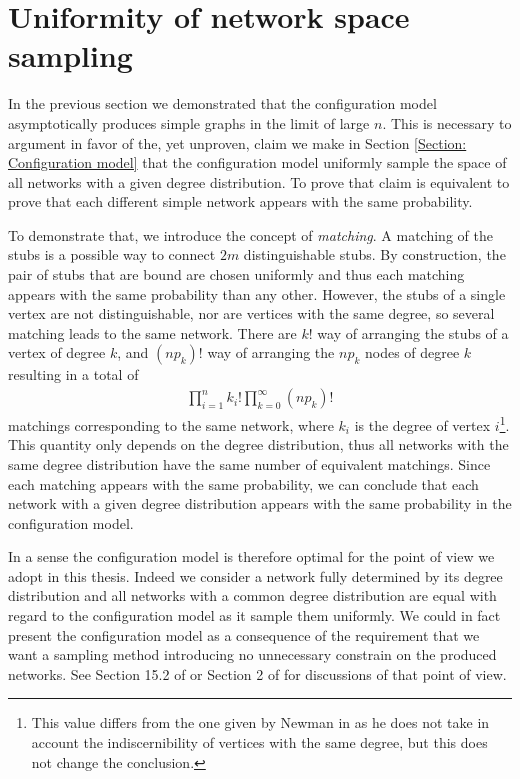 \documentclass[
11pt, %
american, %
singlespacing, %
final, %
nolistspacing, %
liststotoc, %
headsepline, %
]{MastersDoctoralThesis} %
\begin{document}
\section{Uniformity of network space sampling}

In the previous section we demonstrated that the configuration model asymptotically produces simple graphs in the limit of large $n$. This is necessary to argument in favor of the, yet unproven, claim we make in Section \ref{Section: Configuration model} that the configuration model uniformly sample the space of all networks with a given degree distribution. To prove that claim is equivalent to prove that each different simple network appears with the same probability.

To demonstrate that, we introduce the concept of \emph{matching}. A matching of the stubs is a possible way to connect $2 m$ distinguishable stubs. By construction, the pair of stubs that are bound are chosen uniformly and thus each matching appears with the same probability than any other. However, the stubs of a single vertex are not distinguishable, nor are vertices with the same degree, so several matching leads to the same network. There are $k!$ way of arranging the stubs of a vertex of degree $k$, and $(n p_k)!$ way of arranging the $n p_k$ nodes of degree $k$ resulting in a total of
\begin{align}
	\prod_{i = 1}^n k_i! \prod_{k = 0}^\infty (n p_k)!
\end{align}
matchings corresponding to the same network, where $k_i$ is the degree of vertex $i$\footnote{This value differs from the one given by Newman in \cite{newman2010networks} as he does not take in account the indiscernibility of vertices with the same degree, but this does not change the conclusion.}. This quantity only depends on the degree distribution, thus all networks with the same degree distribution have the same number of equivalent matchings. Since each matching appears with the same probability, we can conclude that each network with a given degree distribution appears with the same probability in the configuration model.

In a sense the configuration model is therefore optimal for the point of view we adopt in this thesis. Indeed we consider a network fully determined by its degree distribution and all networks with a common degree distribution are equal with regard to the configuration model as it sample them uniformly. We could in fact present the configuration model as a consequence of the requirement that we want a sampling method introducing no unnecessary constrain on the produced networks. See Section 15.2 of \cite{newman2010networks} or Section 2 of \cite{bauer2002maximal} for discussions of that point of view.
\end{document}
